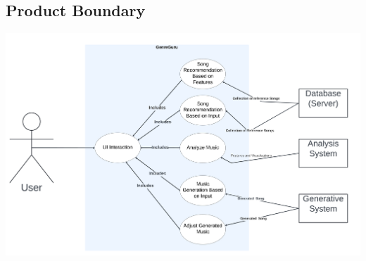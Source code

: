 \documentclass[12pt]{article}
\begin{document}
\subsection{Product Boundary}
\includegraphics[width=\textwidth]{product_boundary.png} \\
\end{document}
